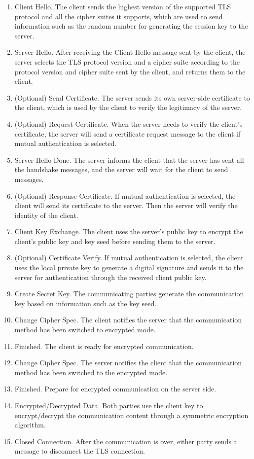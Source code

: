 \documentclass[a4paper,12pt,openany]{book}
\begin{document}
\begin{enumerate}[label=(\arabic*)]
    \item Client Hello. The client sends the highest version of the supported TLS protocol and all the cipher suites it supports, which are used to send information such as the random number for generating the session key to the server.
    \item Server Hello. After receiving the Client Hello message sent by the client, the server selects the TLS protocol version and a cipher suite according to the protocol version and cipher suite sent by the client, and returns them to the client.
    \item (Optional) Send Certificate. The server sends its own server-side certificate to the client, which is used by the client to verify the legitimacy of the server.
    \item (Optional) Request Certificate. When the server needs to verify the client’s certificate, the server will send a certificate request message to the client if mutual authentication is selected.
    \item Server Hello Done. The server informs the client that the server has sent all the handshake messages, and the server will wait for the client to send messages.
    \item (Optional) Response Certificate. If mutual authentication is selected, the client will send  its certificate to the server. Then the server will verify the identity of the client.
    \item Client Key Exchange. The client uses the server’s public key to encrypt the client’s public key and key seed before sending them to the server.
    \item (Optional) Certificate Verify. If mutual authentication is selected, the client uses the local private key to generate a digital signature and sends it to the server for authentication through the received client public key.
    \item Create Secret Key. The communicating parties generate the communication key based on information such as the key seed.
    \item Change Cipher Spec. The client notifies the server that the communication method has been switched to encrypted mode.
    \item Finished. The client is ready for encrypted communication.
    \item Change Cipher Spec. The server notifies the client that the communication method has been switched to the encrypted mode.
    \item Finished. Prepare for encrypted communication on the server side.
    \item Encrypted/Decrypted Data. Both parties use the client key to encrypt/decrypt the communication content through a symmetric encryption algorithm.
    \item Closed Connection. After the communication is over, either party sends a message to disconnect the TLS connection.
\end{enumerate}
\end{document}
